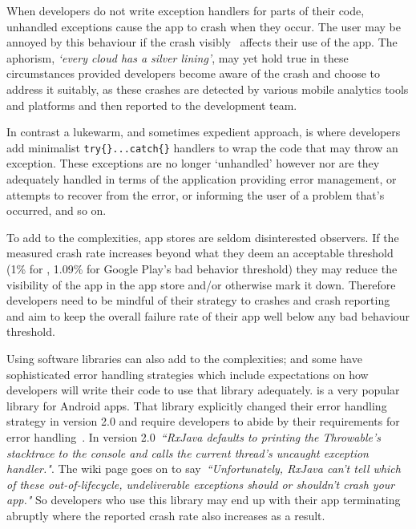 When developers do not write exception handlers for parts of their code, unhandled exceptions cause the app to crash when they occur. The user may be annoyed by this behaviour if the crash visibly~ affects their use of the app. The aphorism, \emph{`every cloud has a silver lining'}, may yet hold true in these circumstances provided developers become aware of the crash and choose to address it suitably, as these crashes are detected by various mobile analytics tools and platforms and then reported to the development team.

In contrast a lukewarm, and sometimes expedient approach, is where developers add minimalist \texttt{try\{\}...catch\{\}} handlers to wrap the code that may throw an exception. These exceptions are no longer `unhandled' however nor are they adequately handled in terms of the application providing error management, or attempts to recover from the error, or informing the user of a problem that's occurred, and so on. %

To add to the complexities, app stores are seldom disinterested observers. If the measured crash rate increases beyond what they deem an acceptable threshold (1\% for  %
, 1.09\% for Google Play's bad behavior threshold) they may reduce the visibility of the app in the app store and/or otherwise mark it down. Therefore developers need to be mindful of their strategy to crashes and crash reporting and aim to keep the overall failure rate of their app well below any bad behaviour threshold.

Using software libraries can also add to the complexities; and some have sophisticated error handling strategies which include expectations on how developers will write their code to use that library adequately.  is a very popular library for Android apps. That library explicitly changed their error handling strategy in version 2.0 and require developers to abide by their requirements for error handling~. In version 2.0~\emph{``RxJava defaults to printing the Throwable's stacktrace to the console and calls the current thread's uncaught exception handler."}. The wiki page goes on to say~\emph{``Unfortunately, RxJava can't tell which of these out-of-lifecycle, undeliverable exceptions should or shouldn't crash your app."} So developers who use this library may end up with their app terminating abruptly where the reported crash rate also increases as a result.

